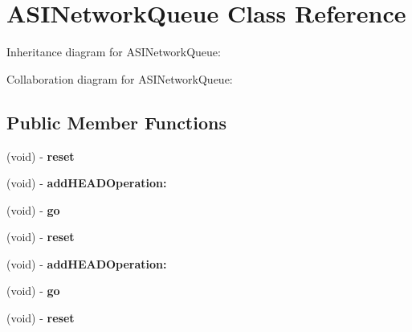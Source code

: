 \hypertarget{interface_a_s_i_network_queue}{
\section{\-A\-S\-I\-Network\-Queue \-Class \-Reference}
\label{interface_a_s_i_network_queue}
}


\-Inheritance diagram for \-A\-S\-I\-Network\-Queue\-:


\-Collaboration diagram for \-A\-S\-I\-Network\-Queue\-:
\subsection*{\-Public \-Member \-Functions}
\begin{DoxyCompactItemize}
\item 
\hypertarget{interface_a_s_i_network_queue_a623cc4e592822a23d4751bbcab630558}{
(void) -\/ {\bfseries reset}}
\label{interface_a_s_i_network_queue_a623cc4e592822a23d4751bbcab630558}

\item 
\hypertarget{interface_a_s_i_network_queue_a0c5d19648386364651e055b273597a75}{
(void) -\/ {\bfseries add\-H\-E\-A\-D\-Operation\-:}}
\label{interface_a_s_i_network_queue_a0c5d19648386364651e055b273597a75}

\item 
\hypertarget{interface_a_s_i_network_queue_abeaa1ecbfc31ec7ae8082ff8394f7b9b}{
(void) -\/ {\bfseries go}}
\label{interface_a_s_i_network_queue_abeaa1ecbfc31ec7ae8082ff8394f7b9b}

\item 
\hypertarget{interface_a_s_i_network_queue_a623cc4e592822a23d4751bbcab630558}{
(void) -\/ {\bfseries reset}}
\label{interface_a_s_i_network_queue_a623cc4e592822a23d4751bbcab630558}

\item 
\hypertarget{interface_a_s_i_network_queue_a0c5d19648386364651e055b273597a75}{
(void) -\/ {\bfseries add\-H\-E\-A\-D\-Operation\-:}}
\label{interface_a_s_i_network_queue_a0c5d19648386364651e055b273597a75}

\item 
\hypertarget{interface_a_s_i_network_queue_abeaa1ecbfc31ec7ae8082ff8394f7b9b}{
(void) -\/ {\bfseries go}}
\label{interface_a_s_i_network_queue_abeaa1ecbfc31ec7ae8082ff8394f7b9b}

\item 
\hypertarget{interface_a_s_i_network_queue_a623cc4e592822a23d4751bbcab630558}{
(void) -\/ {\bfseries reset}}
\label{interface_a_s_i_network_queue_a623cc4e592822a23d4751bbcab630558}


\end{DoxyCompactItemize}
